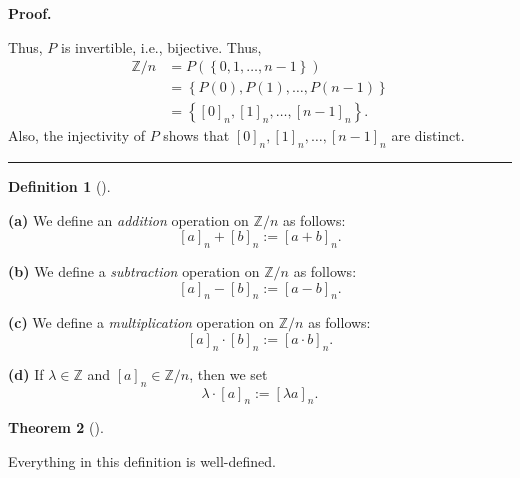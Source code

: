 \documentclass[numbers=enddot,12pt,final,onecolumn,notitlepage]{scrartcl}%
\numberwithin{exer}{subsection}
\theoremstyle{definition}
\newtheorem{theo}{Theorem}[subsection]
\newenvironment{theorem}[1][]
{\begin{theo}[#1]\begin{leftbar}}
{\end{leftbar}\end{theo}}
\newtheorem{defi}[theo]{Definition}
\newenvironment{definition}[1][]
{\begin{defi}[#1]\begin{leftbar}}
{\end{leftbar}\end{defi}}
\newenvironment{proof}[1][Proof]{\noindent\textbf{#1.} }{\ \rule{0.5em}{0.5em}}
\begin{document}
\begin{proof}
\begin{itemize}
\end{itemize}

Thus, $P$ is invertible, i.e., bijective. Thus,%
\begin{align*}
\mathbb{Z}/n  &  =P\left(  \left\{  0,1,\ldots,n-1\right\}  \right) \\
&  =\left\{  P\left(  0\right)  ,P\left(  1\right)  ,\ldots,P\left(
n-1\right)  \right\} \\
&  =\left\{  \left[  0\right]  _{n},\left[  1\right]  _{n},\ldots,\left[
n-1\right]  _{n}\right\}  .
\end{align*}
Also, the injectivity of $P$ shows that $\left[  0\right]  _{n},\left[
1\right]  _{n},\ldots,\left[  n-1\right]  _{n}$ are distinct.
\end{proof}

\begin{definition}
\textbf{(a)} We define an \textit{addition} operation on $\mathbb{Z}/n$ as
follows:%
\[
\left[  a\right]  _{n}+\left[  b\right]  _{n}:=\left[  a+b\right]  _{n}.
\]


\textbf{(b)} We define a \textit{subtraction}\textbf{ }operation on
$\mathbb{Z}/n$ as follows:%
\[
\left[  a\right]  _{n}-\left[  b\right]  _{n}:=\left[  a-b\right]  _{n}.
\]


\textbf{(c)} We define a \textit{multiplication} operation on $\mathbb{Z}/n$
as follows:%
\[
\left[  a\right]  _{n}\cdot\left[  b\right]  _{n}:=\left[  a\cdot b\right]
_{n}.
\]


\textbf{(d)} If $\lambda\in\mathbb{Z}$ and $\left[  a\right]  _{n}%
\in\mathbb{Z}/n$, then we set
\[
\lambda\cdot\left[  a\right]  _{n}:=\left[  \lambda a\right]  _{n}.
\]

\end{definition}

\begin{theorem}
Everything in this definition is well-defined.
\end{theorem}
\end{document}
